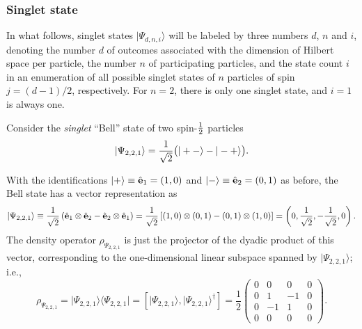 \documentclass[fleqn,twoside]{article}      %
\begin{document}
\subsubsection*{Singlet state}




In what follows, singlet states $\vert \Psi_{d,n,i} \rangle$ will be labeled by three numbers $d$, $n$ and $i$,
denoting
the number $d$ of outcomes associated with the dimension of Hilbert space per particle,
the number $n$ of participating particles,
and the state count $i$ in an enumeration of all possible singlet states of $n$ particles of spin $j=(d-1)/2$, respectively.
For $n=2$, there is only one singlet state, and $i=1$ is always one.

Consider the {\em singlet} ``Bell'' state of two spin-${1\over 2}$
particles
\begin{equation}
\vert \Psi_{2,2,1} \rangle
=
 {1\over \sqrt{2}}
\bigl(
\vert +- \rangle -
\vert -+ \rangle
\bigr)
.
\label{2009-gtq-s1s21}
\end{equation}

With the identifications
$
\vert +\rangle
\equiv {\hat {\bf e}}_1 =(1,0)
$
and
$
\vert -\rangle \equiv {\hat {\bf e}}_2 =(0,1)
$ as before,
the Bell state has a vector representation as
\begin{equation}
\vert  \Psi_{2,2,1}\rangle
 \equiv
{1\over \sqrt{2}}\left({\hat {\bf e}}_1\otimes {\hat {\bf e}}_2-{\hat {\bf e}}_2\otimes {\hat {\bf e}}_1 \right)
= {1\over \sqrt{2}}\left[ (1,0)\otimes (0,1) - (0,1) \otimes (1,0)\right]
=\left( 0,\frac{1}{\sqrt{2}},- \frac{1}{\sqrt{2}} ,  0 \right).
\label{2005-hp-ep12s1v}
\end{equation}
The density operator $\rho_{\Psi_{2,2,1}}$
is just the projector of the dyadic product of this vector, corresponding to the one-dimensional
linear subspace spanned by  $\vert  \Psi_{2,2,1}\rangle $; i.e.,
\begin{equation}
\rho_{\Psi_{2,2,1}} = \vert  \Psi_{2,2,1}\rangle \langle  \Psi_{2,2,1} \vert
=
\left[ \vert  \Psi_{2,2,1}\rangle ,\vert  \Psi_{2,2,1}\rangle^\dagger \right]
=
\frac{1}{2}
 \left(
\begin{array}{rrrr}
0&0&0&0\\
0&1&-1&0\\
0&-1&1&0\\
0&0&0&0
\end{array}
\right)
.
\end{equation}
\end{document}
